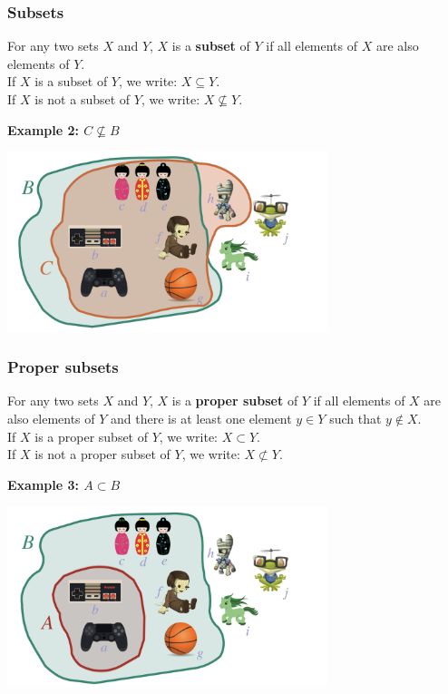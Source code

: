\documentclass[fleqn,10pt,serif,xcolor=svgnames,xcolor=table,aspectratio=169,handout]{beamer}
\begin{document}
\begin{frame}
  \frametitle{Subsets}

  For any two sets $X$ and $Y$, $X$ is a \textbf{subset} of $Y$ if all elements of $X$ are also elements of $Y$. \\
  If $X$ is a subset of $Y$, we write: $X \subseteq Y$.\\
  If $X$ is not a subset of $Y$, we write: $X \not \subseteq Y$.

  \bigskip

  \hfill \textbf{Example 2: $C \not \subseteq B$}

  \hfill \includegraphics[width = 0.7\textwidth]{01b-sets-relations-operations/01b-sets-relations-operations-002.jpeg}

\end{frame}

\begin{frame}
  \frametitle{Proper subsets}

  For any two sets $X$ and $Y$, $X$ is a \textbf{proper subset} of $Y$ if all elements of $X$ are also elements of $Y$ and there is at least one element $y \in Y$ such that $y \not \in X$.\\
  If $X$ is a proper subset of $Y$, we write: $X \subset Y$.\\
  If $X$ is not a proper subset of $Y$, we write: $X \not \subset Y$.

\pause

  \bigskip

  \hfill \textbf{Example 3: $A \subset B$}

  \hfill \includegraphics[width = 0.7\textwidth]{01b-sets-relations-operations/01b-sets-relations-operations-001.jpeg}

\end{frame}
\end{document}
